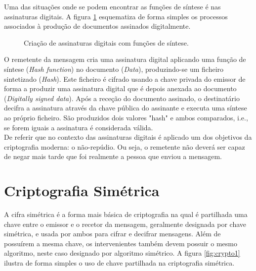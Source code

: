 \documentclass[a4paper,11pt,openright,oneside]{report}
\begin{document}
Uma das situações onde se podem encontrar as funções de síntese é nas assinaturas digitais. A figura \ref{fig:crypto5} esquematiza de forma simples os processos associados à produção de documentos assinados digitalmente.

\begin{figure}[ht]
\center
{}
\caption{Criação de assinaturas digitais com funções de síntese.}
\label{fig:crypto5}
\end{figure}

O remetente da mensagem cria uma assinatura digital aplicando uma função de síntese (\textit{Hash function}) no documento (\textit{Data}), produzindo-se um ficheiro sintetizado (\textit{Hash}). Este ficheiro é cifrado usando a chave privada do emissor de forma a produzir uma assinatura digital que é depois anexada ao documento (\textit{Digitally signed data}). Após a receção do documento assinado, o destinatário decifra a assinatura através da chave pública do assinante e executa uma síntese ao próprio ficheiro. São produzidos dois valores "hash" e ambos comparados, i.e., se forem iguais a assinatura é considerada válida.\\

De referir que no contexto das assinaturas digitais é aplicado um dos objetivos da criptografia moderna: o não-repúdio. Ou seja, o remetente não deverá ser capaz de negar mais tarde que foi realmente a pessoa que enviou a mensagem.

\section{Criptografia Simétrica}
\label{chalp.simétrica}

A cifra simétrica é a forma mais básica de criptografia na qual é partilhada uma chave entre o emissor e o recetor da mensagem, geralmente designada por chave simétrica, e usada por ambos para cifrar e decifrar mensagens. Além de possuírem a mesma chave, os intervenientes também devem possuir o mesmo algoritmo, neste caso designado por algoritmo simétrico. A figura \ref{fig:crypto1} ilustra de forma simples o uso de chave partilhada na criptografia simétrica.
\end{document}
